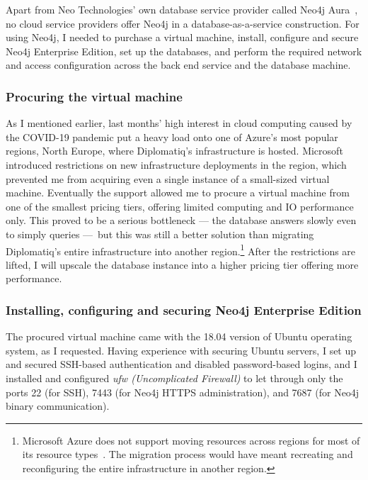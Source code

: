 Apart from Neo Technologies' own database service provider called Neo4j Aura~\cite{neo4j-aura}, no cloud service providers offer Neo4j in a database-as-a-service construction. For using Neo4j, I needed to purchase a virtual machine, install, configure and secure Neo4j Enterprise Edition, set up the databases, and perform the required network and access configuration across the back end service and the database machine.

\subsubsection{Procuring the virtual machine}

As I mentioned earlier, last months' high interest in cloud computing caused by the COVID-19 pandemic put a heavy load onto one of Azure's most popular regions, North Europe, where Diplomatiq's infrastructure is hosted. Microsoft introduced restrictions on new infrastructure deployments in the region, which prevented me from acquiring even a single instance of a small-sized virtual machine. Eventually the support allowed me to procure a virtual machine from one of the smallest pricing tiers, offering limited computing and IO performance only. This proved to be a serious bottleneck — the database answers slowly even to simply queries — but this was still a better solution than migrating Diplomatiq's entire infrastructure into another region.\footnote{Microsoft Azure does not support moving resources across regions for most of its resource types~\cite{azure-migration}. The migration process would have meant recreating and reconfiguring the entire infrastructure in another region.} After the restrictions are lifted, I will upscale the database instance into a higher pricing tier offering more performance.

\subsubsection{Installing, configuring and securing Neo4j Enterprise Edition}

The procured virtual machine came with the 18.04 version of Ubuntu operating system, as I requested. Having experience with securing Ubuntu servers, I set up and secured SSH-based authentication and disabled password-based logins, and I installed and configured \emph{ufw (Uncomplicated Firewall)} to let through only the ports 22 (for SSH), 7443 (for Neo4j HTTPS administration), and 7687 (for Neo4j binary communication).

